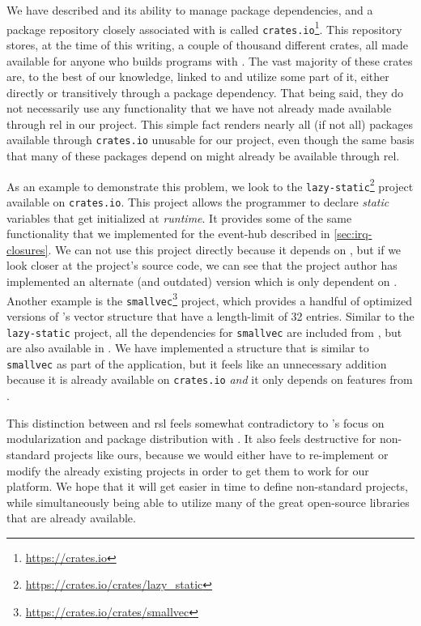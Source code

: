 We have described {\cargo} and its ability to manage package dependencies, and a package repository closely associated with {\cargo} is called \texttt{crates.io}\footnote{\url{https://crates.io}}.
This repository stores, at the time of this writing, a couple of thousand different {\rust} crates, all made available for anyone who builds {\rust} programs with {\cargo}.
The vast majority of these crates are, to the best of our knowledge, linked to {\std} and utilize some part of it, either directly or transitively through a package dependency.
That being said, they do not necessarily use any functionality that we have not already made available through \gls{rel} in our project.
This simple fact renders nearly all (if not all) packages available through \texttt{crates.io} unusable for our project, even though the same basis that many of these packages depend on might already be available through \gls{rel}.

As an example to demonstrate this problem, we look to the \texttt{lazy-static}\footnote{\url{https://crates.io/crates/lazy_static}} project available on \texttt{crates.io}.
This project allows the programmer to declare \emph{static} variables that get initialized at \emph{runtime}.
It provides some of the same functionality that we implemented for the event-hub described in \autoref{sec:irq-closures}.
We can not use this project directly because it depends on {\std}, but if we look closer at the project's source code, we can see that the project author has implemented an alternate (and outdated) version which is only dependent on {\core}.
Another example is the \texttt{smallvec}\footnote{\url{https://crates.io/crates/smallvec}} project, which provides a handful of optimized versions of {\rust}'s vector structure that have a length-limit of 32 entries.
Similar to the \texttt{lazy-static} project, all the dependencies for \texttt{smallvec} are included from {\std}, but are also available in {\core}.
We have implemented a structure that is similar to \texttt{smallvec} as part of the {\tracker} application, but it feels like an unnecessary addition because it is already available on \texttt{crates.io} \emph{and} it only depends on features from {\core}.

This distinction between {\std} and \gls{rsl} feels somewhat contradictory to {\rust}'s focus on modularization and package distribution with {\cargo}.
It also feels destructive for non-standard projects like ours, because we would either have to re-implement or modify the already existing projects in order to get them to work for our platform.
We hope that it will get easier in time to define non-standard projects, while simultaneously being able to utilize many of the great open-source libraries that are already available.

